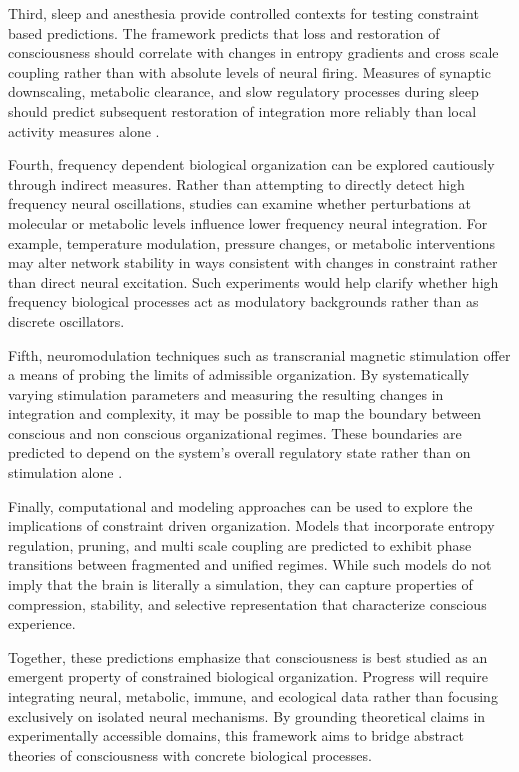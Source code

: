 \documentclass[12pt,letterpaper]{article}
\begin{document}
Third, sleep and anesthesia provide controlled contexts for testing constraint based predictions. The framework predicts that loss and restoration of consciousness should correlate with changes in entropy gradients and cross scale coupling rather than with absolute levels of neural firing. Measures of synaptic downscaling, metabolic clearance, and slow regulatory processes during sleep should predict subsequent restoration of integration more reliably than local activity measures alone \cite{tononi2014, casali2013}.

Fourth, frequency dependent biological organization can be explored cautiously through indirect measures. Rather than attempting to directly detect high frequency neural oscillations, studies can examine whether perturbations at molecular or metabolic levels influence lower frequency neural integration. For example, temperature modulation, pressure changes, or metabolic interventions may alter network stability in ways consistent with changes in constraint rather than direct neural excitation. Such experiments would help clarify whether high frequency biological processes act as modulatory backgrounds rather than as discrete oscillators.

Fifth, neuromodulation techniques such as transcranial magnetic stimulation offer a means of probing the limits of admissible organization. By systematically varying stimulation parameters and measuring the resulting changes in integration and complexity, it may be possible to map the boundary between conscious and non conscious organizational regimes. These boundaries are predicted to depend on the system's overall regulatory state rather than on stimulation alone \cite{massimini2005, casali2013}.

Finally, computational and modeling approaches can be used to explore the implications of constraint driven organization. Models that incorporate entropy regulation, pruning, and multi scale coupling are predicted to exhibit phase transitions between fragmented and unified regimes. While such models do not imply that the brain is literally a simulation, they can capture properties of compression, stability, and selective representation that characterize conscious experience.

Together, these predictions emphasize that consciousness is best studied as an emergent property of constrained biological organization. Progress will require integrating neural, metabolic, immune, and ecological data rather than focusing exclusively on isolated neural mechanisms. By grounding theoretical claims in experimentally accessible domains, this framework aims to bridge abstract theories of consciousness with concrete biological processes.
\end{document}
